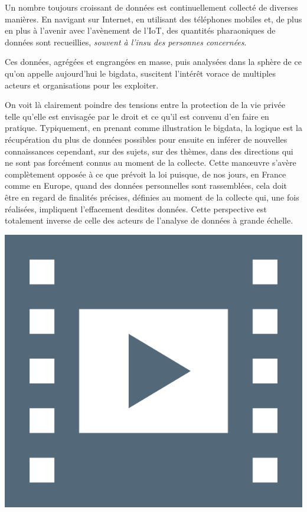 Un nombre toujours croissant de données est continuellement collecté de diverses manières. En navigant sur Internet, en utilisant des téléphones mobiles et, de plus en plus à l'avenir avec l'avènement de l'\gls{IoT}, des quantités pharaoniques de données sont recueillies, \emph{souvent à l'insu des personnes concernées}.

Ces données, agrégées et engrangées en masse, puis analysées dans la sphère de ce qu'on appelle aujourd'hui le \gls{bigdata}, suscitent l'intérêt vorace de multiples acteurs et organisations pour les exploiter.

On voit là clairement poindre des tensions entre la protection de la vie privée telle qu'elle est envisagée par le droit et ce qu'il est convenu d'en faire en pratique.
Typiquement, en prenant comme illustration le \gls{bigdata}, la logique est la récupération du plus de données possibles pour ensuite en inférer de nouvelles connaissances cependant, sur des sujets, sur des thèmes, dans des directions qui ne sont pas forcément connus au moment de la collecte. Cette manœuvre s'avère complètement opposée à ce que prévoit la loi puisque, de nos jours, en France comme en Europe, quand des données personnelles sont rassemblées, cela doit être en regard de finalités précises, définies au moment de la collecte qui, une fois réalisées, impliquent l'effacement desdites données.
Cette perspective est totalement inverse de celle des acteurs de l'analyse de données à grande échelle. 

\begin{marginvideo}
	[\label{vid:I.6}Loi et vie privée.]%
	\href{https://www.youtube.com/watch?v=jiQ5CHsdM5E&list=PLWvGMqXvyJAMNWRvODUB5Ry3licACdaa0&index=8}%
	  {\includegraphics[width=\marginparwidth]{./Images/Pictograms/film-strip-dark-electric-blue.png}}%
\end{marginvideo}

